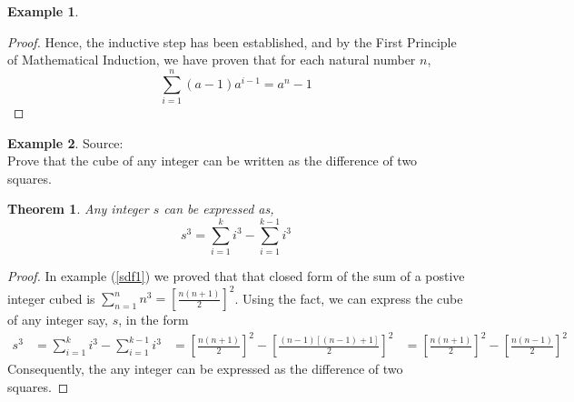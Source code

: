 \documentclass{book}
\newtheorem{theorem}{Theorem}[section]
\theoremstyle{definition}
\newtheorem{example}{Example}[definition]
\theoremstyle{remark}
\begin{document}
\begin{example}
\begin{proof}
        Hence, the inductive step has been established, and by the First Principle of Mathematical Induction, we have proven that for each natural number $n$,
            \begin{equation*}
                \sum_{i=1}^{n}{(a-1)a^{i-1}} = a^n - 1
            \end{equation*}
    \end{proof}
\end{example}





\newpage
\begin{example}
Source: \cite[Chap.1, S.1.1, Prob.1.1, Q.4]{david} \\ 

Prove that the cube of any integer can be written as the difference of two squares. 
    \begin{tcolorbox}
        \begin{theorem}
            Any integer $s$ can be expressed as,
                \begin{equation*}
                    s^3 = \sum_{i=1}^{k}{i^3} - \sum_{i=1}^{k-1}{i^3}  
                \end{equation*}
        \end{theorem}
    \end{tcolorbox}

    \begin{proof}
        In example (\ref{sdf1}) we proved that that closed form of the sum of a postive integer cubed is $\sum_{n=1}^{n}{n^3} = \left [\frac{n(n+1)}{2} \right ]^2$. Using the fact, we can express the cube of any integer say, $s$, in the form
            \begin{align*}
                s^3 & = \sum_{i=1}^{k}{i^3} - \sum_{i=1}^{k-1}{i^3} 
                    & = \left [\frac{n(n+1)}{2} \right ]^2 - \left [\frac{(n-1)[(n-1)+1]}{2} \right ]^2
                    & = \left [\frac{n(n+1)}{2} \right ]^2 - \left [\frac{n(n-1)}{2} \right ]^2
            \end{align*}
    Consequently, the any integer can be expressed as the difference of two squares.
    
    \end{proof}
\end{example}
\end{document}
